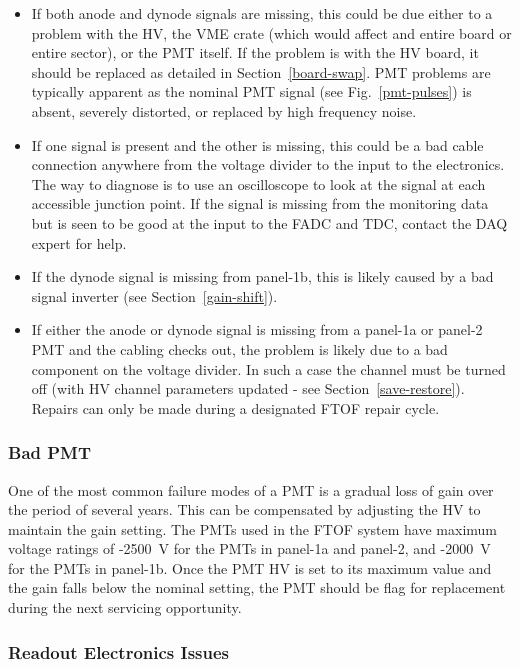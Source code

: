 \documentclass[letterpaper,10pt]{article}
\begin{document}
\begin{itemize}
\item If both anode and dynode signals are missing, this could be due either to a problem with the HV, 
the VME crate (which would affect and entire board or entire sector), or the PMT itself. If the problem
is with the HV board, it should be replaced as detailed in Section~\ref{board-swap}. PMT problems are
typically apparent as the nominal PMT signal (see Fig.~\ref{pmt-pulses}) is absent, severely distorted, 
or replaced by high frequency noise.
\item If one signal is present and the other is missing, this could be a bad cable connection anywhere
from the voltage divider to the input to the electronics. The way to diagnose is to use an
oscilloscope to look at the signal at each accessible junction point. If the signal is missing from the
monitoring data but is seen to be good at the input to the FADC and TDC, contact the DAQ expert for
help.
\item If the dynode signal is missing from panel-1b, this is likely caused by a bad signal inverter
(see Section~\ref{gain-shift}).
\item If either the anode or dynode signal is missing from a panel-1a or panel-2 PMT and the cabling
checks out, the problem is likely due to a bad component on the voltage divider. In such a case the
channel must be turned off (with HV channel parameters updated - see Section~\ref{save-restore}). 
Repairs can only be made during a designated FTOF repair cycle.
\end{itemize}

\subsubsection{Bad PMT}
\label{bad-pmt}

One of the most common failure modes of a PMT is a gradual loss of gain over the period of
several years. This can be compensated by adjusting the HV to maintain the gain setting. The
PMTs used in the FTOF system have maximum voltage ratings of -2500~V for the PMTs in panel-1a
and panel-2, and -2000~V for the PMTs in panel-1b. Once the PMT HV is set to its maximum value
and the gain falls below the nominal setting, the PMT should be flag for replacement during
the next servicing opportunity.

\subsubsection{Readout Electronics Issues}
\label{readout-issues}
\end{document}
